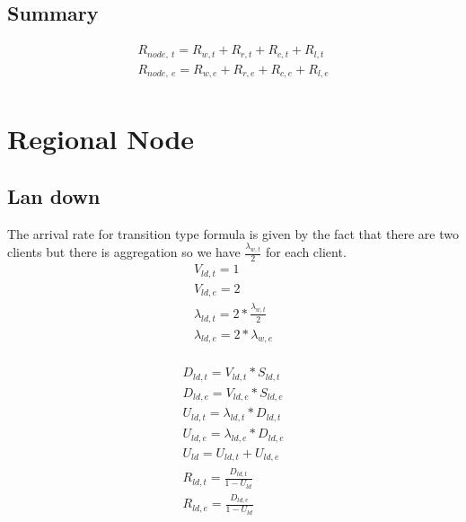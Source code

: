 \documentclass[11pt]{article}
\begin{document}
\subsection{Summary}
\begin{equation}
    \begin{array}{l}
        R_{node, \ t} = R_{w, t} + R_{r, t} + R_{c, t} + R_{l, t} \\
        R_{node, \ e} = R_{w, e} + R_{r, e} + R_{c, e} + R_{l, e} \\
    \end{array}
\end{equation}


\section{Regional Node}

\subsection{Lan down}
The arrival rate for transition type formula is given by the fact that there are two clients but there is aggregation so we have $\frac{\lambda_{w, t}}{2}$ for each client.
\begin{equation}
    \begin{array}{l}
        V_{ld, t} = 1 \\
        V_{ld, e} = 2 \\
        \lambda_{ld, t} = 2*\frac{\lambda_{w, t}}{2} \\ %
        \lambda_{ld, e} = 2*\lambda_{w, e} \\
    \end{array}
\end{equation}

\begin{equation}
    \begin{array}{l}
        D_{ld, t} = V_{ld, t} * S_{ld, t} \\
        D_{ld, e} = V_{ld, e} * S_{ld, e} \\
        U_{ld, t} = \lambda_{ld, t} * D_{ld, t} \\
        U_{ld, e} = \lambda_{ld, e} * D_{ld, e} \\
        U_{ld} = U_{ld, t} + U_{ld, e} \\
        R_{ld, t} = \frac{D_{ld, t}}{1 - U_{ld}} \\
        R_{ld, e} = \frac{D_{ld, e}}{1 - U_{ld}} \\
    \end{array}
\end{equation}
\end{document}

